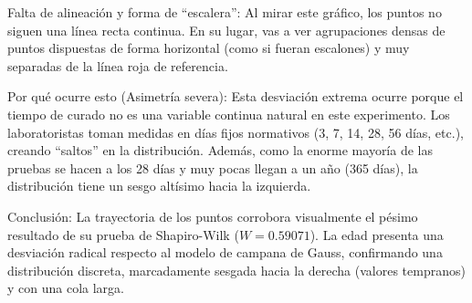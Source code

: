 \documentclass[
]{book}
\begin{document}
Falta de alineación y forma de ``escalera'': Al mirar este gráfico, los puntos no siguen una línea recta continua. En su lugar, vas a ver agrupaciones densas de puntos dispuestas de forma horizontal (como si fueran escalones) y muy separadas de la línea roja de referencia.

Por qué ocurre esto (Asimetría severa): Esta desviación extrema ocurre porque el tiempo de curado no es una variable continua natural en este experimento. Los laboratoristas toman medidas en días fijos normativos (3, 7, 14, 28, 56 días, etc.), creando ``saltos'' en la distribución. Además, como la enorme mayoría de las pruebas se hacen a los 28 días y muy pocas llegan a un año (365 días), la distribución tiene un sesgo altísimo hacia la izquierda.

Conclusión: La trayectoria de los puntos corrobora visualmente el pésimo resultado de su prueba de Shapiro-Wilk (\(W = 0.59071\)). La edad presenta una desviación radical respecto al modelo de campana de Gauss, confirmando una distribución discreta, marcadamente sesgada hacia la derecha (valores tempranos) y con una cola larga.


\end{document}
